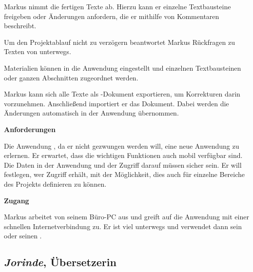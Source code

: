 \begin{multicols}{2}
Markus nimmt die fertigen Texte ab. Hierzu kann er einzelne Textbausteine freigeben oder Änderungen anfordern, die er mithilfe von Kommentaren beschreibt. 

Um den Projektablauf nicht zu verzögern beantwortet Markus Rückfragen zu Texten von unterwegs.

Materialien können in die Anwendung eingestellt und einzelnen Textbausteinen oder ganzen Abschnitten zugeordnet werden.

Markus kann sich alle Texte als -Dokument exportieren, um Korrekturen darin vorzunehmen. Anschließend importiert er das Dokument. Dabei werden die Änderungen automatisch in der Anwendung übernommen.

\textbf{Anforderungen}

Die Anwendung , da er nicht gezwungen werden will, eine neue Anwendung zu erlernen. Er erwartet, dass die wichtigen Funktionen auch mobil verfügbar sind. Die Daten in der Anwendung und der Zugriff darauf müssen sicher sein. Er will festlegen, wer Zugriff erhält, mit der Möglichkeit, dies auch für einzelne Bereiche des Projekts definieren zu können.

\textbf{Zugang}

Markus arbeitet von seinem Büro-PC aus und greift auf die Anwendung mit einer schnellen Internetverbindung zu. Er ist viel unterwegs und verwendet dann sein  oder seinen .

\end{multicols}

\pagebreak

\subsection{\emph{Jorinde}, Übersetzerin}\label{p:jorinde}

